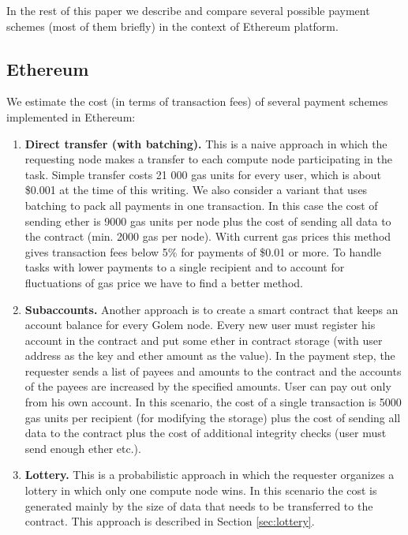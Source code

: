 \documentclass[a4paper]{article}
\begin{document}
    In the rest of this paper we describe and compare several possible payment schemes (most of them briefly) in the
    context of Ethereum platform.

\subsection{Ethereum}
    We estimate the cost (in terms of transaction fees) of several payment schemes implemented in Ethereum:

    \begin{enumerate}
        \item \textbf{Direct transfer (with batching).}
        This is a naive approach in which the requesting node makes a transfer to each compute node participating
        in the task.
        Simple transfer costs 21 000 gas units for every user, which is about \$0.001 at the time of this writing.
        We also consider a variant that uses batching\cite{BUTERIN} to pack all payments in one transaction.
        In this case the cost of sending ether is 9000 gas units per node plus the cost of sending all data
        to the contract (min. 2000 gas per node). With current gas prices this method gives transaction fees
        below 5\% for payments of \$0.01 or more. To handle tasks with lower payments to a single recipient and to
        account for fluctuations of gas price we have to find a better method.
	    \item \textbf{Subaccounts.}
        Another approach is to create a smart contract that keeps an account balance for every Golem node.
        Every new user must register his account in the contract and put some ether in contract storage (with user
        address as the key and ether amount as the value). In the payment step, the requester sends a list of payees
        and amounts to the contract and the accounts of the payees are increased by the specified amounts.
        User can pay out only from his own account. In this scenario, the cost of a single transaction is 5000 gas
        units per recipient (for modifying the storage) plus the cost of sending all data to the contract plus the
        cost of additional integrity checks (user must send enough ether etc.).
	    \item \textbf{Lottery.}
        This is a probabilistic approach in which the requester organizes a lottery in which only one compute node
        wins. In this scenario the cost is generated mainly by the size of data that needs to be transferred to
        the contract. This approach is described in Section \ref{sec:lottery}.
    \end{enumerate}
\end{document}
